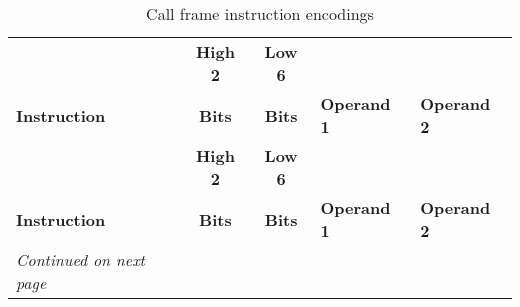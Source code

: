 \begin{centering}
\setlength{\extrarowheight}{0.1cm}
\begin{longtable}{l|c|c|l|l}
  \caption{Call frame instruction encodings} \label{tab:callframeinstructionencodings} \\
  \hline &\bfseries High 2 &\bfseries Low 6 &  & \\
  \bfseries Instruction&\bfseries Bits &\bfseries Bits &\bfseries Operand 1 &\bfseries Operand 2\\ \hline
\endfirsthead
   & \bfseries High 2 &\bfseries Low 6 &  &\\
  \bfseries Instruction&\bfseries Bits &\bfseries Bits &\bfseries Operand 1 &\bfseries Operand 2\\ \hline
\endhead
  \hline \emph{Continued on next page}
\endfoot
  \hline
\endlastfoot


\end{longtable}
\end{centering}
